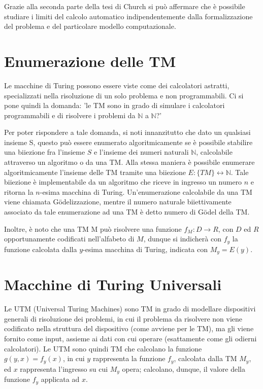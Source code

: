   Grazie alla seconda parte della tesi di Church si può affermare che è possibile studiare i limiti del calcolo automatico indipendentemente dalla formalizzazione del problema e del particolare modello computazionale.

  \section{Enumerazione delle TM}
  Le macchine di Turing possono essere viste come dei calcolatori astratti, specializzati nella risoluzione di un solo problema e non programmabili. Ci si pone quindi la domanda: 'le TM sono in grado di simulare i calcolatori programmabili e di risolvere i problemi da \(\mathbb{N}\) a \(\mathbb{N}\)?'

  Per poter rispondere a tale domanda, si noti innanzitutto che dato un qualsiasi insieme S, questo può essere enumerato algoritmicamente se è possibile stabilire una biiezione fra l'insieme \(S\) e l'insieme dei numeri naturali \(\mathbb{N}\), calcolabile attraverso un algoritmo o da una TM.
  Alla stessa maniera è possibile enumerare algoritmicamente l'insieme delle TM tramite una biiezione \(E:\{TM\}\leftrightarrow\mathbb{N}\). Tale biiezione è implementabile da un algoritmo che riceve in ingresso un numero \(n\) e ritorna la \(n\)-esima macchina di Turing. Un'enumerazione calcolabile da una TM viene chiamata Gödelizzazione, mentre il numero naturale biiettivamente associato da tale enumerazione ad una TM è detto numero di Gödel della TM. 

  Inoltre, è noto che una TM M può risolvere una funzione \(f_M:D\to R\), con \(D\) ed \(R\) opportunamente codificati nell'alfabeto di \(M\), dunque si indicherà con \(f_y\) la funzione calcolata dalla \(y\)-esima macchina di Turing, indicata con \(M_y=E(y)\).

  \section{Macchine di Turing Universali}
  Le UTM (Universal Turing Machines) sono TM in grado di modellare dispositivi generali di risoluzione dei problemi, in cui il problema da risolvere non viene codificato nella struttura del dispositivo (come avviene per le TM), ma gli viene fornito come input, assieme ai dati con cui operare (esattamente come gli odierni calcolatori). Le UTM sono quindi TM che calcolano la funzione \(g(y,x)=f_y(x)\), in cui \(y\) rappresenta la funzione \(f_y\), calcolata dalla TM \(M_y\), ed \(x\) rappresenta l'ingresso su cui \(M_y\) opera; calcolano, dunque, il valore della funzione \(f_y\) applicata ad \(x\).

